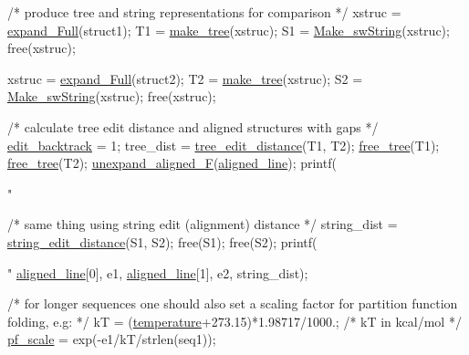 \begin{DoxyCodeInclude}
   \textcolor{comment}{/* produce tree and string representations for comparison */}
   xstruc = \hyperlink{group__struct__utils_ga78d73cd54a068ef2812812771cdddc6f}{expand\_Full}(struct1);
   T1 = \hyperlink{treedist_8h_a08fe4d5afd385dce593b86eaf010c6e3}{make\_tree}(xstruc);
   S1 = \hyperlink{stringdist_8h_a3125991b3a403b3f89230474deb3f22e}{Make\_swString}(xstruc);
   free(xstruc);

   xstruc = \hyperlink{group__struct__utils_ga78d73cd54a068ef2812812771cdddc6f}{expand\_Full}(struct2);
   T2 = \hyperlink{treedist_8h_a08fe4d5afd385dce593b86eaf010c6e3}{make\_tree}(xstruc);
   S2 = \hyperlink{stringdist_8h_a3125991b3a403b3f89230474deb3f22e}{Make\_swString}(xstruc);
   free(xstruc);

   \textcolor{comment}{/* calculate tree edit distance and aligned structures with gaps */}
   \hyperlink{dist__vars_8h_aa03194c513af6b860e7b33e370b82bdb}{edit\_backtrack} = 1;
   tree\_dist = \hyperlink{treedist_8h_a3b21f1925f7071f46d93431a835217bb}{tree\_edit\_distance}(T1, T2);
   \hyperlink{treedist_8h_acbc1cb9bce582ea945e4a467c76a57aa}{free\_tree}(T1); \hyperlink{treedist_8h_acbc1cb9bce582ea945e4a467c76a57aa}{free\_tree}(T2);
   \hyperlink{group__struct__utils_ga1054c4477d53b31d79d4cb132100e87a}{unexpand\_aligned\_F}(\hyperlink{dist__vars_8h_ac1605fe3448ad0a0b809c4fb8f6a854a}{aligned\_line});
   printf(\textcolor{stringliteral}{"%

   \textcolor{comment}{/* same thing using string edit (alignment) distance */}
   string\_dist = \hyperlink{stringdist_8h_a89e3c335ef17780576d7c0e713830db9}{string\_edit\_distance}(S1, S2);
   free(S1); free(S2);
   printf(\textcolor{stringliteral}{"%
          \hyperlink{dist__vars_8h_ac1605fe3448ad0a0b809c4fb8f6a854a}{aligned\_line}[0], e1, \hyperlink{dist__vars_8h_ac1605fe3448ad0a0b809c4fb8f6a854a}{aligned\_line}[1], e2, string\_dist);

   \textcolor{comment}{/* for longer sequences one should also set a scaling factor for}
\textcolor{comment}{      partition function folding, e.g: */}
   kT = (\hyperlink{group__model__details_gab4b11c8d9c758430960896bc3fe82ead}{temperature}+273.15)*1.98717/1000.;  \textcolor{comment}{/* kT in kcal/mol */}
   \hyperlink{group__model__details_gad3b22044065acc6dee0af68931b52cfd}{pf\_scale} = exp(-e1/kT/strlen(seq1));

}}
\end{DoxyCodeInclude}

